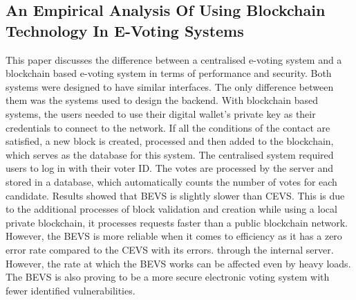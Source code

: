 \documentclass{IEEEtran}
\begin{document}
    \subsection{An Empirical Analysis Of Using Blockchain Technology In E-Voting Systems \cite{9681365}}
      This paper discusses the difference between a centralised e-voting system and a blockchain based e-voting system in terms of performance and security. Both systems were designed to have similar interfaces. The only difference between them was the systems used to design the backend. With blockchain based systems, the users needed to use their digital wallet's private key as their credentials to connect to the network. If all the conditions of the contact are satisfied, a new block is created, processed and then added to the blockchain, which serves as the database for this system. The centralised system required users to log in with their voter ID. The votes are processed by the server and stored in a database, which automatically counts the number of votes for each candidate.  Results showed that BEVS is slightly slower than CEVS. This is due to the additional processes of block validation and creation while using a local private blockchain, it processes requests faster than a public blockchain network.  However, the BEVS is more reliable when it comes to efficiency as it has a zero error rate compared to the CEVS with its errors. through the internal server. However, the rate at which the BEVS works can be affected even by heavy loads. The BEVS is also proving to be a more secure electronic voting system with fewer identified vulnerabilities.
      
\end{document}
